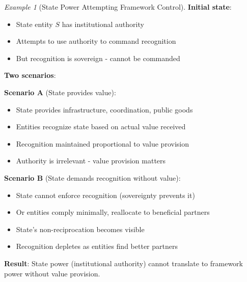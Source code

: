 \documentclass[11pt,a4paper]{article}
\theoremstyle{definition}
\theoremstyle{remark}
\newtheorem{example}[theorem]{Example}
\begin{document}
\begin{example}[State Power Attempting Framework Control]
\textbf{Initial state}:
\begin{itemize}
\item State entity $S$ has institutional authority
\item Attempts to use authority to command recognition
\item But recognition is sovereign - cannot be commanded
\end{itemize}

\textbf{Two scenarios}:

\textbf{Scenario A} (State provides value):
\begin{itemize}
\item State provides infrastructure, coordination, public goods
\item Entities recognize state based on actual value received
\item Recognition maintained proportional to value provision
\item Authority is irrelevant - value provision matters
\end{itemize}

\textbf{Scenario B} (State demands recognition without value):
\begin{itemize}
\item State cannot enforce recognition (sovereignty prevents it)
\item Or entities comply minimally, reallocate to beneficial partners
\item State's non-reciprocation becomes visible
\item Recognition depletes as entities find better partners
\end{itemize}

\textbf{Result}: State power (institutional authority) cannot translate to framework power without value provision.
\end{example}
\end{document}
